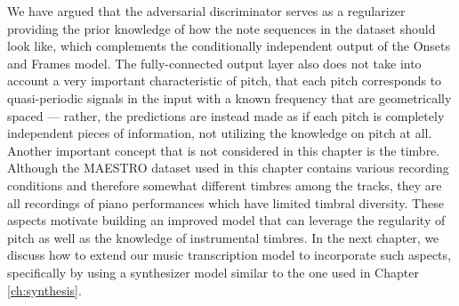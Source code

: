 We have argued that the adversarial discriminator serves as a regularizer providing the prior knowledge of how the note sequences in the dataset should look like, which complements the conditionally independent output of the Onsets and Frames model.
The fully-connected output layer also does not take into account a very important characteristic of pitch, that each pitch corresponds to quasi-periodic signals in the input with a known frequency that are geometrically spaced --- rather, the predictions are instead made as if each pitch is completely independent pieces of information, not utilizing the knowledge on pitch at all.
Another important concept that is not considered in this chapter is the timbre.
Although the MAESTRO dataset used in this chapter contains various recording conditions and therefore somewhat different timbres among the tracks, they are all recordings of piano performances which have limited timbral diversity.
These aspects motivate building an improved model that can leverage the regularity of pitch as well as the knowledge of instrumental timbres.
In the next chapter, we discuss how to extend our music transcription model to incorporate such aspects, specifically by using a synthesizer model similar to the one used in Chapter \ref{ch:synthesis}.
